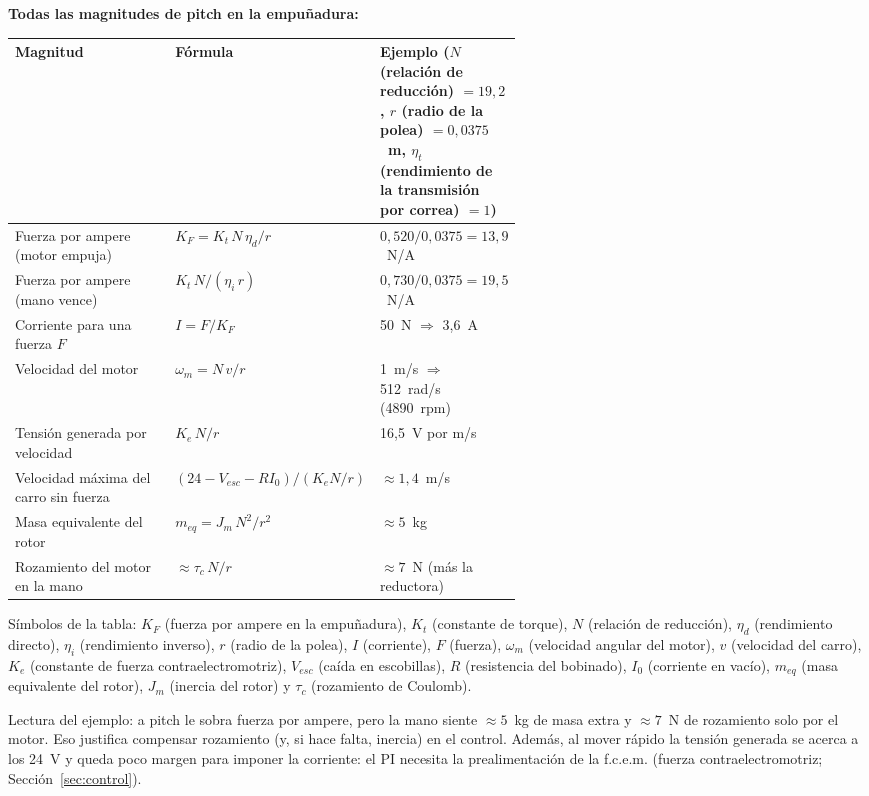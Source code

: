 \documentclass[11pt,a4paper]{article}
\begin{document}
\textbf{Todas las magnitudes de pitch en la empuñadura:}
\begin{center}
\begin{tabularx}{\linewidth}{>{\raggedright\arraybackslash}p{0.33\linewidth}>{\raggedright\arraybackslash}p{0.26\linewidth}X}
\toprule
Magnitud & Fórmula & Ejemplo ($N$ (relación de reducción) $= 19{,}2$, $r$ (radio de la polea) $= 0{,}0375$~m, $\eta_t$ (rendimiento de la transmisión por correa) $= 1$) \\
\midrule
Fuerza por ampere (motor empuja) & $K_F = K_t\,N\,\eta_d/r$ & $0{,}520/0{,}0375 = 13{,}9$~N/A \\
Fuerza por ampere (mano vence) & $K_t\,N/(\eta_i\,r)$ & $0{,}730/0{,}0375 = 19{,}5$~N/A \\
Corriente para una fuerza $F$ & $I = F/K_F$ & 50~N $\Rightarrow$ 3,6~A \\
Velocidad del motor & $\omega_m = N\,v/r$ & 1~m/s $\Rightarrow$ 512~rad/s (4890~rpm) \\
Tensión generada por velocidad & $K_e\,N/r$ & 16,5~V por m/s \\
Velocidad máxima del carro sin fuerza & $(24 - V_{esc} - R I_0)/(K_e N/r)$ & $\approx 1{,}4$~m/s \\
Masa equivalente del rotor & $m_{eq} = J_m\,N^2/r^2$ & $\approx 5$~kg \\
Rozamiento del motor en la mano & $\approx \tau_c\,N/r$ & $\approx 7$~N (más la reductora) \\
\bottomrule
\end{tabularx}
\end{center}
Símbolos de la tabla: $K_F$ (fuerza por ampere en la empuñadura), $K_t$ (constante de torque), $N$ (relación de reducción), $\eta_d$ (rendimiento directo), $\eta_i$ (rendimiento inverso), $r$ (radio de la polea), $I$ (corriente), $F$ (fuerza), $\omega_m$ (velocidad angular del motor), $v$ (velocidad del carro), $K_e$ (constante de fuerza contraelectromotriz), $V_{esc}$ (caída en escobillas), $R$ (resistencia del bobinado), $I_0$ (corriente en vacío), $m_{eq}$ (masa equivalente del rotor), $J_m$ (inercia del rotor) y $\tau_c$ (rozamiento de Coulomb).

Lectura del ejemplo: a pitch le sobra fuerza por ampere, pero la mano siente $\approx 5$~kg de masa extra y $\approx 7$~N de rozamiento solo por el motor. Eso justifica compensar rozamiento (y, si hace falta, inercia) en el control. Además, al mover rápido la tensión generada se acerca a los 24~V y queda poco margen para imponer la corriente: el PI necesita la prealimentación de la f.c.e.m. (fuerza contraelectromotriz; Sección~\ref{sec:control}).
\end{document}
